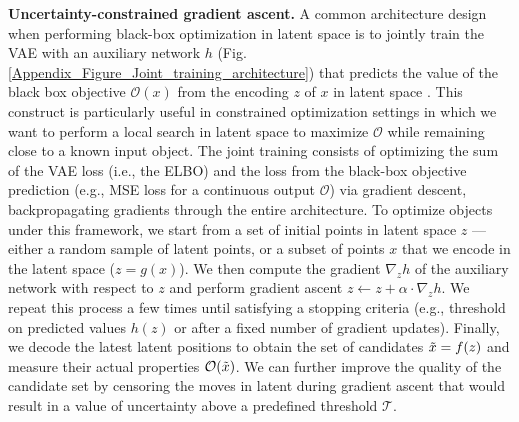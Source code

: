 \textbf{Uncertainty-constrained gradient ascent.} A common architecture design when performing black-box optimization in latent space is to jointly train the VAE with an auxiliary network $h$ (Fig.\ref{Appendix_Figure_Joint_training_architecture}) that predicts the value of the black box objective $\mathcal{O}(x)$ from the encoding $z$ of $x$ in latent space \citep{Gomez_Bombarelli_2018,bradshaw2019model,jin2019junction}. This construct is particularly useful in constrained optimization settings in which we want to perform a local search in latent space to maximize $\mathcal{O}$ while remaining close to a known input object.
The joint training consists of optimizing the sum of the VAE loss (i.e., the ELBO) and the loss from the black-box objective prediction (e.g., MSE loss for a continuous output $\mathcal{O}$) via gradient descent, backpropagating gradients through the entire architecture.
To optimize objects under this framework, we start from a set of initial points in latent space $z$ --- either a random sample of latent points, or a subset of points $x$ that we encode in the latent space ($z = g(x)$). We then compute the gradient $\nabla_{z}{h}$ of the auxiliary network with respect to $z$ and perform gradient ascent $ z \leftarrow z + \alpha \cdot \nabla_{z}{h}$. We repeat this process a few times until satisfying a stopping criteria (e.g., threshold on predicted values $h(z)$ or after a fixed number of gradient updates). Finally, we decode the latest latent positions to obtain the set of candidates $\Tilde{x} = f(z)$ and measure their actual properties $\mathcal{O}(\Tilde{x})$.
We can further improve the quality of the candidate set by censoring the moves in latent during gradient ascent that would result in a value of uncertainty above a predefined threshold $\mathcal{T}$. 


